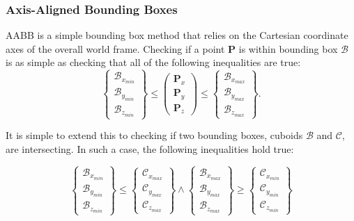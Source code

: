 \subsubsection{Axis-Aligned Bounding Boxes}
\gls{AABB} is a simple bounding box method that relies on the Cartesian coordinate axes of the overall world frame. Checking if a point $\textbf{P}$ is within bounding box $\mathcal{B}$ is as simple as checking that all of the following inequalities are true:
\begin{equation}
\begin{Bmatrix}
\mathcal{B}_{x_{min}} \\ \mathcal{B}_{y_{min}} \\ \mathcal{B}_{z_{min}}
\end{Bmatrix}
\leq
\begin{pmatrix}
\textbf{P}_x \\ \textbf{P}_y \\ \textbf{P}_z
\end{pmatrix}
\leq
\begin{Bmatrix}
\mathcal{B}_{x_{max}} \\ \mathcal{B}_{y_{max}} \\ \mathcal{B}_{z_{max}}
\end{Bmatrix}.
\end{equation}

It is simple to extend this to checking if two bounding boxes, cuboids $\mathcal{B}$ and $\mathcal{C}$, are intersecting. In such a case, the following inequalities hold true:

\begin{equation}
\begin{Bmatrix}
\mathcal{B}_{x_{min}} \\ \mathcal{B}_{y_{min}} \\ \mathcal{B}_{z_{min}}
\end{Bmatrix}
\leq
\begin{Bmatrix}
\mathcal{C}_{x_{max}} \\ \mathcal{C}_{y_{max}} \\ \mathcal{C}_{z_{max}}
\end{Bmatrix}
\wedge
\begin{Bmatrix}
\mathcal{B}_{x_{max}} \\ \mathcal{B}_{y_{max}} \\ \mathcal{B}_{z_{max}}
\end{Bmatrix}
\geq
\begin{Bmatrix}
\mathcal{C}_{x_{min}} \\ \mathcal{C}_{y_{min}} \\ \mathcal{C}_{z_{min}}
\end{Bmatrix}
\end{equation}



